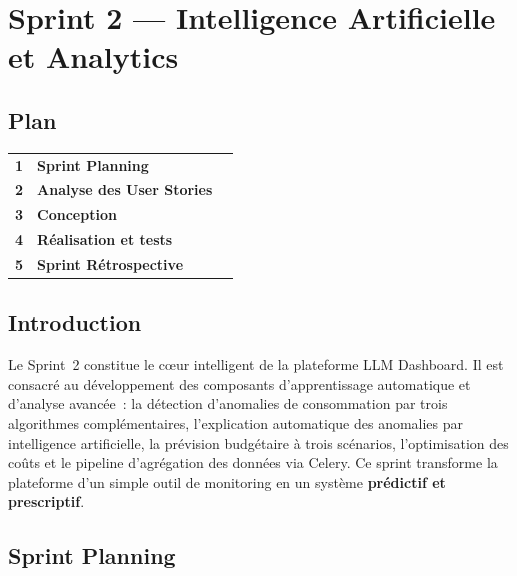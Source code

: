 
\chapter{Sprint 2 --- Intelligence Artificielle et Analytics}

\section*{Plan}

\begin{tabular}{r l r}
\textbf{1} & \textbf{Sprint Planning} & \textbf{\pageref{sec:s2_planning}} \\
\textbf{2} & \textbf{Analyse des User Stories} & \textbf{\pageref{sec:s2_stories}} \\
\textbf{3} & \textbf{Conception} & \textbf{\pageref{sec:s2_conception}} \\
\textbf{4} & \textbf{Réalisation et tests} & \textbf{\pageref{sec:s2_realisation}} \\
\textbf{5} & \textbf{Sprint Rétrospective} & \textbf{\pageref{sec:s2_retro}} \\
\end{tabular}

\section*{Introduction}

Le Sprint~2 constitue le c\oe ur intelligent de la plateforme LLM Dashboard. Il est consacré au développement des composants d'apprentissage automatique et d'analyse avancée~: la détection d'anomalies de consommation par trois algorithmes complémentaires, l'explication automatique des anomalies par intelligence artificielle, la prévision budgétaire à trois scénarios, l'optimisation des coûts et le pipeline d'agrégation des données via Celery. Ce sprint transforme la plateforme d'un simple outil de monitoring en un système \textbf{prédictif et prescriptif}.

\section{Sprint Planning}
\label{sec:s2_planning}

